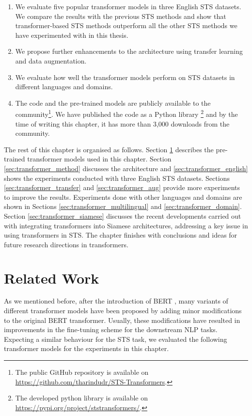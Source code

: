 \begin{enumerate}
\item We evaluate five popular transformer models in three English STS datasets. We compare the results with the previous STS methods and show that transformer-based STS methods outperform all the other STS methods we have experimented with in this thesis.

\item We propose further enhancements to the architecture using transfer learning and data augmentation.   

\item We evaluate how well the transformer models perform on STS datasets in different languages and domains. 

\item The code and the pre-trained models are publicly available to the community\footnote{The public GitHub repository is available on \url{https://github.com/tharindudr/STS-Transformers}.}. We have published the code as a Python library \footnote{The developed python library is available on \url{https://pypi.org/project/ststransformers/}.} and by the time of writing this chapter, it has more than 3,000 downloads from the community. 

\end{enumerate}

The rest of this chapter is organised as follows. Section \ref{sec:transformers_related} describes the pre-trained transformer models used in this chapter. Section \ref{sec:transformer_method} discusses the architecture and \ref{sec:transformer_english} shows the experiments conducted with three English STS datasets. Sections \ref{sec:transformer_transfer} and \ref{sec:transformer_aug} provide more experiments to improve the results. Experiments done with other languages and domains are shown in Sections \ref{sec:transformer_multilingual} and \ref{sec:transformer_domain}. Section \ref{sec:transformer_siamese} discusses the recent developments carried out with integrating transformers into Siamese architectures, addressing a key issue in using transformers in STS. The chapter finishes with conclusions and ideas for future research directions in transformers. 

\section{Related Work}
\label{sec:transformers_related}
As we mentioned before, after the introduction of BERT \autocite{devlin-etal-2019-bert}, many variants of different transformer models have been proposed by adding minor modifications to the original BERT transformer. Usually, these modifications have resulted in improvements in the fine-tuning scheme for the downstream NLP tasks. Expecting a similar behaviour for the STS task, we evaluated the following transformer models for the experiments in this chapter.

